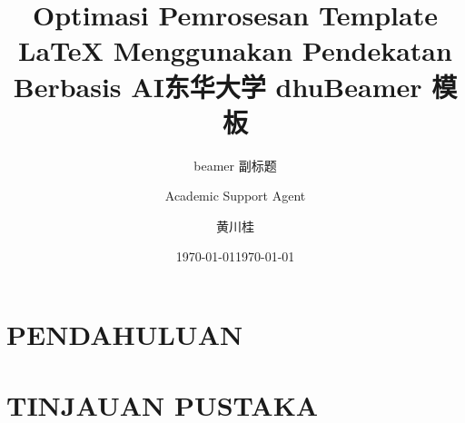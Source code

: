 \documentclass{beamer}
\title{Optimasi Pemrosesan Template LaTeX Menggunakan Pendekatan Berbasis AI}
\author{Academic Support Agent}
\date{\today}
\begin{document}
\maketitle

\begin{abstract}

\end{abstract}

\chapter{PENDAHULUAN}


\chapter{TINJAUAN PUSTAKA}


\usepackage{resume/dhuBeamer}

\title{东华大学 dhuBeamer 模板}
\subtitle{beamer 副标题}
\author[3000ye]{黄川桂}
\date{\today}
\end{document}
